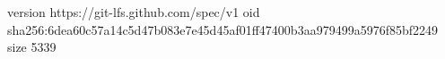 version https://git-lfs.github.com/spec/v1
oid sha256:6dea60c57a14c5d47b083e7e45d45af01ff47400b3aa979499a5976f85bf2249
size 5339
